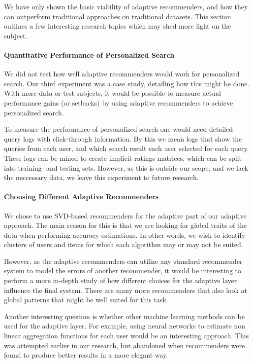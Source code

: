 We have only shown the basic viability of adaptive recommenders,
and how they can outperform traditional approaches on traditional datasets.
This section outlines a few interesting research topics
which may shed more light on the subject.


\paragraph{Quantitative Performance of Personalized Search}

We did not test how well adaptive recommenders would work for personalized search.
Our third experiment was a case study, detailing how this might be done.
With more data or test subjects, it would be possible to measure
actual performance gains (or setbacks) by using adaptive recommenders to
achieve personalized search.

To measure the performance of personalized search one would need detailed query logs with click-through information.
By this we mean logs that show the queries from each user, and which search result each user
selected for each query.
These logs can be mined to create implicit ratings matrices, which can be split into
training- and testing sets.
However, as this is outside our scope, and we lack the neccessary data,
we leave this experiment to future research.


\paragraph{Choosing Different Adaptive Recommenders}
We chose to use SVD-based recommenders for the adaptive part of our adaptive approach.
The main reason for this is that we are looking for global traits of the data
when performing accuracy estimations. In other words, we wish to identify
clusters of users and items for which each algorithm may or may not be suited.

However, as the adaptive recommenders can utilize any standard recommender system
to model the errors of another recommender, it would be interesting to perform
a more in-depth study of how different choices for the adaptive layer
influence the final system.
There are many more recommenders that also look at global patterns
that might be well suited for this task.

Another interesting question is whether other machine learning methods can be used for the adaptive layer.
For example, using neural networks to estimate non linear aggregation functions for each user would be an interesting approach.
This was attempted earlier in our research, but abandoned when recommenders were found to produce
better results in a more elegant way.



